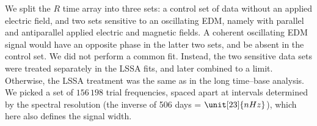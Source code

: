 We split the $R$ time array into three sets:
a control set of data without an applied electric field, and two sets sensitive to an oscillating EDM, namely with parallel and antiparallel applied electric and magnetic fields.
A coherent oscillating EDM signal would have an opposite phase in the latter two sets, and be absent in the control set.
We did not perform a common fit. Instead, the two sensitive data sets were treated separately in the LSSA fits, and later combined to a limit. Otherwise, the LSSA treatment was the same as in the long time--base analysis. We picked a set of $156\,198$ trial frequencies, spaced apart at intervals determined by the spectral resolution
(the inverse of 506 days = $\unit[23]{nHz}$), which here also defines the signal width.

